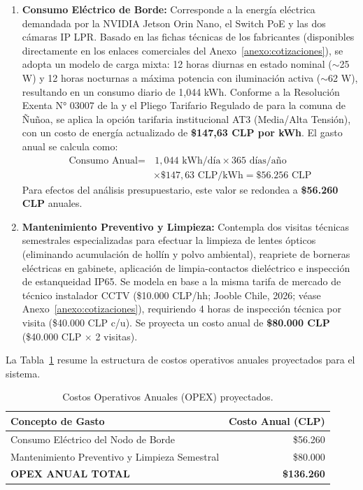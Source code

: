 \begin{enumerate}
    \item \textbf{Consumo Eléctrico de Borde:} Corresponde a la energía eléctrica demandada por la NVIDIA Jetson Orin Nano, el Switch PoE y las dos cámaras IP LPR. Basado en las fichas técnicas de los fabricantes (disponibles directamente en los enlaces comerciales del Anexo~\ref{anexo:cotizaciones}), se adopta un modelo de carga mixta: 12 horas diurnas en estado nominal ($\sim$25 W) y 12 horas nocturnas a máxima potencia con iluminación activa ($\sim$62 W), resultando en un consumo diario de 1,044 kWh. Conforme a la Resolución Exenta N° 03007 de la \textcite{UTEMRes30072021} y el Pliego Tarifario Regulado de \textcite{EnelDistribucionChile} para la comuna de Ñuñoa, se aplica la opción tarifaria institucional AT3 (Media/Alta Tensión), con un costo de energía actualizado de \textbf{\$147,63 CLP por kWh}. El gasto anual se calcula como:
    \begin{align}
        \text{Consumo Anual} = & \, 1{,}044 \text{ kWh/día} \times 365 \text{ días/año} \nonumber \\
        & \times \$147{,}63 \text{ CLP/kWh} = \$56.256 \text{ CLP}
    \end{align}
    Para efectos del análisis presupuestario, este valor se redondea a \textbf{\$56.260 CLP} anuales.
    
    \item \textbf{Mantenimiento Preventivo y Limpieza:} Contempla dos visitas técnicas semestrales especializadas para efectuar la limpieza de lentes ópticos (eliminando acumulación de hollín y polvo ambiental), reapriete de borneras eléctricas en gabinete, aplicación de limpia-contactos dieléctrico e inspección de estanqueidad IP65. Se modela en base a la misma tarifa de mercado de técnico instalador CCTV (\$10.000 CLP/hh; Jooble Chile, 2026; véase Anexo~\ref{anexo:cotizaciones}), requiriendo 4 horas de inspección técnica por visita (\$40.000 CLP c/u). Se proyecta un costo anual de \textbf{\$80.000 CLP} (\$40.000 CLP $\times$ 2 visitas).
\end{enumerate}

La Tabla~\ref{tab:opex} resume la estructura de costos operativos anuales proyectados para el sistema.

\begin{table}[H]
    \centering
    \caption{Costos Operativos Anuales (OPEX) proyectados.}
    \begin{tabular}{|p{8cm}|r|}
        \hline
        \textbf{Concepto de Gasto} & \textbf{Costo Anual (CLP)} \\ \hline
        Consumo Eléctrico del Nodo de Borde & \$56.260 \\ \hline
        Mantenimiento Preventivo y Limpieza Semestral & \$80.000 \\ \hline
        \hline
        \textbf{OPEX ANUAL TOTAL} & \textbf{\$136.260} \\ \hline
    \end{tabular}
    \label{tab:opex}
\end{table}

